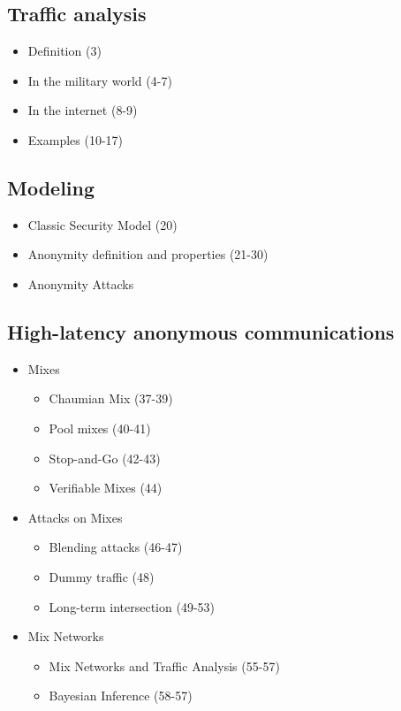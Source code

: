 \documentclass[../overview.tex]{subfiles}
\begin{document}
\subsection{Traffic analysis}
\begin{itemize}
		\item Definition (3)
		\item In the military world (4-7) 
		\item In the internet (8-9)
		\item Examples (10-17)
\end{itemize}

\subsection{Modeling}
\begin{itemize}
		\item Classic Security Model (20)
		\item Anonymity definition and properties (21-30)
		\item Anonymity Attacks
\end{itemize}

\subsection{High-latency anonymous communications}
\begin{itemize}
		\item Mixes
		\begin{itemize}
				\item Chaumian Mix (37-39)
				\item Pool mixes (40-41)
				\item Stop-and-Go (42-43)
				\item Verifiable Mixes (44)
		\end{itemize}
		\item Attacks on Mixes
		\begin{itemize}
				\item Blending attacks (46-47)
				\item Dummy traffic (48)
				\item Long-term intersection (49-53)
		\end{itemize}
		\item Mix Networks
		\begin{itemize}
				\item Mix Networks and Traffic Analysis (55-57)
				\item Bayesian Inference (58-57)
		\end{itemize}
\end{itemize}
\end{document}
